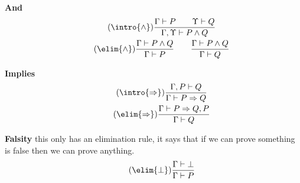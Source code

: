 \textbf{And}
\begin{gather}
    \tag{$\intro{\wedge}$}
    \frac{\Gamma \vdash P\qquad \Upsilon \vdash Q}{\Gamma, \Upsilon \vdash P\wedge Q}\\
    \tag{$\elim{\wedge}$}
    \frac{\Gamma \vdash P\wedge Q}{\Gamma\vdash P}
    \qquad
    \frac{\Gamma \vdash P\wedge Q}{\Gamma\vdash Q}
\end{gather}

\textbf{Implies}
\begin{gather}
    \tag{$\intro{\Rightarrow}$}
    \frac{\Gamma, P \vdash Q}{\Gamma \vdash P\Rightarrow Q}\\
    \tag{$\elim{\Rightarrow}$}
    \frac{\Gamma \vdash P\Rightarrow Q, P}{\Gamma\vdash Q}
\end{gather}


\textbf{Falsity} this only has an elimination rule, it says that if we can prove 
something is false then we can prove anything.
\begin{gather}
    \tag{$\elim{\bot}$}
    \frac{\Gamma\vdash\bot}{\Gamma\vdash P}
\end{gather}

